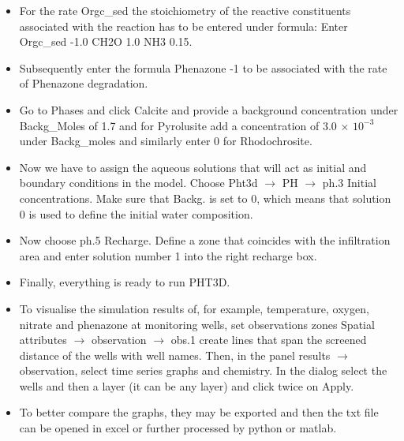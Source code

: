 \begin{itemize}
\item For the rate {\color{blue}Orgc\_sed} the stoichiometry of the reactive constituents 
associated with the reaction has to be entered under 
formula: Enter {\color{blue}Orgc\_sed -1.0 CH2O 1.0 NH3 0.15}.

\item Subsequently enter the formula {\color{blue}Phenazone -1} to be 
associated with the rate of {\color{blue}Phenazone} degradation.

\item Go to {\color{blue}Phases} and click  {\color{blue}Calcite} and provide a background concentration
under {\color{blue}Backg\_Moles} of 1.7 and for {\color{blue}Pyrolusite} 
add a concentration of 3.0 $\times$ $10^{-3}$ under {\color{blue}Backg\_moles} and similarly enter 0 for 
{\color{blue}Rhodochrosite}. 

\item Now we have to assign the aqueous solutions 
that will act as initial and boundary conditions in the model. 
Choose {\color{blue}Pht3d} $\rightarrow$ {\color{blue}PH} $\rightarrow$ {\color{blue}ph.3 Initial concentrations}. 
Make sure that {\color{blue}Backg.} is set to 0, which means that 
solution 0 is used to define the initial water composition.

\item Now choose {\color{blue}ph.5 Recharge}. 
Define a zone that coincides with the infiltration area 
and enter solution number 1 into the right recharge box. 

\item Finally, everything is ready to run PHT3D.
  
\item To visualise the simulation results of, for example, 
temperature, oxygen, nitrate and phenazone at monitoring wells, 
set observations zones {\color{blue}Spatial attributes} 
$\rightarrow$ {\color{blue}observation} $\rightarrow$ {\color{blue}obs.1} 
create lines that span the screened distance of the wells with well names. 
Then, in the panel {\color{blue}results} $\rightarrow$ {\color{blue}observation}, 
select time series graphs and chemistry. 
In the dialog select the wells and then a layer (it can be any layer) 
and click twice on {\color{blue}Apply}. 

\item To better compare the graphs, they may be exported and then 
the txt file can be opened in excel or further processed by python or matlab.

\end{itemize}

